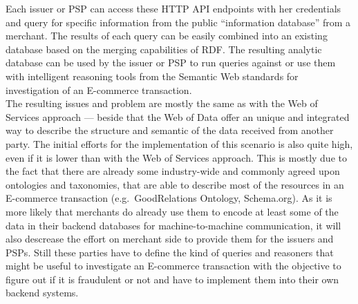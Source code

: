 Each issuer or \gls{PSP} can access these \gls{HTTP} \gls{API} endpoints with her credentials and query for specific information from the public ``information database'' from a merchant. The results of each query can be easily combined into an existing database based on the merging capabilities of \gls{RDF}. The resulting analytic database can be used by the issuer or \gls{PSP} to run queries against or use them with intelligent reasoning tools from the Semantic Web standards for investigation of an E-commerce transaction. \\

The resulting issues and problem are mostly the same as with the Web of Services approach --- beside that the Web of Data offer an unique and integrated way to describe the structure and semantic of the data received from another party. The initial efforts for the implementation of this scenario is also quite high, even if it is lower than with the Web of Services approach. This is mostly due to the fact that there are already some industry-wide and commonly agreed upon ontologies and taxonomies, that are able to describe most of the resources in an E-commerce transaction (e.g.\ GoodRelations Ontology, Schema.org). As it is more likely that merchants do already use them to encode at least some of the data in their backend databases for machine-to-machine communication, it will also descrease the effort on merchant side to provide them for the issuers and \gls{PSP}s. Still these parties have to define the kind of queries and reasoners that might be useful to investigate an E-commerce transaction with the objective to figure out if it is fraudulent or not and have to implement them into their own backend systems.


